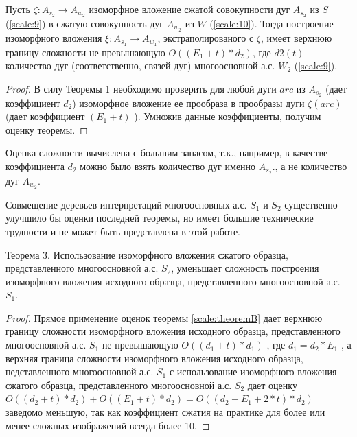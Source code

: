 \begin{theorem}
Пусть  $\zeta : A_{s_2} \to A_{w_2}$  изоморфное вложение сжатой совокупности дуг $A_{s_2}$  из $S$ (\ref{scale:9}) в  сжатую  совокупность дуг $A_{w_2}$ из  $W$ (\ref{scale:10}). Тогда  построение изоморфного вложения  $\xi : A_{s_1} \to A_{w_1}$,   экстраполированого с  $\zeta$, имеет верхнюю границу сложности не превышающую $O((E_1 + t)* d_2)$,  где  $d2(t)$ – количество дуг (соответственно, связей дуг) многоосновной  а.с. $W_2$ (\ref{scale:9}).
\end{theorem}
\begin{proof}
В силу Теоремы 1 необходимо проверить для любой дуги  $arc$  из $A_{s_2}$  (дает коэффициент $d_2$) изоморфное вложение  ее прообраза  в  прообразы дуги $\zeta(arc)$ (дает коэффициент  $(E_1 + t)$ ). Умножив данные коэффициенты,  получим оценку теоремы.                        
\end{proof}           

\begin{remark}
Оценка сложности вычислена с большим запасом, т.к., например, в качестве коэффициента $d_2$  можно было взять количество  дуг именно  $A_{s_2}$., а не количество  дуг  $A_{w_2}$.
\end{remark}

\begin{remark}
Совмещение деревьев интерпретаций   многоосновных  а.с. $S_1$  и  $S_2$ существенно улучшило бы оценки последней теоремы, но имеет большие технические трудности и не может быть представлена  в этой работе.
\end{remark}

\begin{theorem}
Теорема 3.  Использование изоморфного вложения сжатого образца, представленного  многоосновной  а.с. $S_2$,  уменьшает сложность построения изоморфного вложения исходного образца, представленного  многоосновной  а.с.  $S_1$.
\label{scale:theorem:3}
\end{theorem}

\begin{proof}
Прямое применение оценок теоремы \ref{scale:theoremB}  дает верхнюю границу сложности изоморфного вложения исходного образца, представленного  многоосновной  а.с. $S_1$  не превышающую $O((d_1 + t)* d_1)$ , где  $d_1 = d_2 * E_1$ , а верхняя граница  сложности изоморфного вложения исходного образца, педставленного  многоосновной  а.с.   $S_1$  с использование изоморфного вложения сжатого образца, представленного  многоосновной  а.с.  $S_2$ дает оценку $O((d_2 + t)* d_2) +  O((E_1 + t)* d_2) =  O((d_2 + E_1 + 2 * t ) * d_2 )$ заведомо меньшую, так как коэффициент сжатия на практике для более или менее сложных изображений всегда более 10.
\end{proof}
                  
